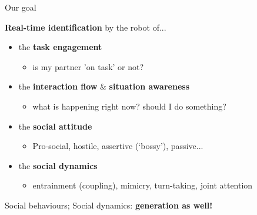 \documentclass[compress]{beamer}
\begin{document}
\begin{frame}{Our goal}

    {\bf Real-time identification} by the robot of...

    \begin{itemize}
        \item<+-> the \textbf{task engagement}
            \begin{itemize}
                \item is my partner 'on task' or not?
            \end{itemize}
        \item<+-> the \textbf{interaction flow} \& \textbf{situation awareness}
            \begin{itemize}
                \item what is happening right now? should I do something?
            \end{itemize}
        \item<+-> the \textbf{social attitude}
            \begin{itemize}
                \item Pro-social, hostile, assertive (‘bossy’), passive...
            \end{itemize}
        \item<+-> the \textbf{social dynamics}
            \begin{itemize}
                \item entrainment (coupling), mimicry, turn-taking, joint
                    attention
            \end{itemize}
    \end{itemize}

    \pause

    Social behaviours; Social dynamics: \textbf{generation as well!}
\end{frame}


%
%
%
%

\end{document}
